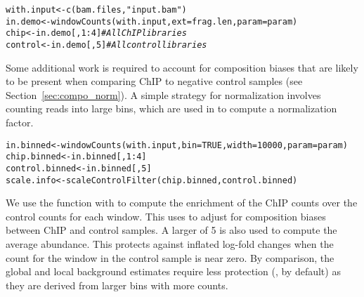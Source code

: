 \documentclass{report}\usepackage[]{graphicx}\usepackage[usenames,dvipsnames]{color}
\newcommand{\hlnum}[1]{\textcolor[rgb]{0.816,0.125,0.439}{#1}}%
\newcommand{\hlstr}[1]{\textcolor[rgb]{0.251,0.627,0.251}{#1}}%
\newcommand{\hlcom}[1]{\textcolor[rgb]{0.502,0.502,0.502}{\textit{#1}}}%
\newcommand{\hlopt}[1]{\textcolor[rgb]{0,0,0}{#1}}%
\newcommand{\hlstd}[1]{\textcolor[rgb]{0.251,0.251,0.251}{#1}}%
\newcommand{\hlkwb}[1]{\textcolor[rgb]{0,0,0}{#1}}%
\newcommand{\hlkwc}[1]{\textcolor[rgb]{0.251,0.251,0.251}{#1}}%
\newcommand{\hlkwd}[1]{\textcolor[rgb]{0.878,0.439,0.125}{#1}}%
\newenvironment{knitrout}{}{} %
\begin{document}
\begin{knitrout}
\color{fgcolor}\begin{kframe}
\begin{alltt}
\hlstd{with.input} \hlkwb{<-} \hlkwd{c}\hlstd{(bam.files,} \hlstr{"input.bam"}\hlstd{)}
\hlstd{in.demo} \hlkwb{<-} \hlkwd{windowCounts}\hlstd{(with.input,} \hlkwc{ext}\hlstd{=frag.len,} \hlkwc{param}\hlstd{=param)}
\hlstd{chip} \hlkwb{<-} \hlstd{in.demo[,}\hlnum{1}\hlopt{:}\hlnum{4}\hlstd{]} \hlcom{# All ChIP libraries}
\hlstd{control} \hlkwb{<-} \hlstd{in.demo[,}\hlnum{5}\hlstd{]} \hlcom{# All control libraries}
\end{alltt}
\end{kframe}
\end{knitrout}

Some additional work is required to account for composition biases that are likely to be present when comparing ChIP to negative control samples (see Section~\ref{sec:compo_norm}).
A simple strategy for normalization involves counting reads into large bins, which are used in  to compute a normalization factor.

\begin{knitrout}
\color{fgcolor}\begin{kframe}
\begin{alltt}
\hlstd{in.binned} \hlkwb{<-} \hlkwd{windowCounts}\hlstd{(with.input,} \hlkwc{bin}\hlstd{=}\hlnum{TRUE}\hlstd{,} \hlkwc{width}\hlstd{=}\hlnum{10000}\hlstd{,} \hlkwc{param}\hlstd{=param)}
\hlstd{chip.binned} \hlkwb{<-} \hlstd{in.binned[,}\hlnum{1}\hlopt{:}\hlnum{4}\hlstd{]}
\hlstd{control.binned} \hlkwb{<-} \hlstd{in.binned[,}\hlnum{5}\hlstd{]}
\hlstd{scale.info} \hlkwb{<-} \hlkwd{scaleControlFilter}\hlstd{(chip.binned, control.binned)}
\end{alltt}
\end{kframe}
\end{knitrout}

We use the  function with  to compute the enrichment of the ChIP counts over the control counts for each window.
This uses  to adjust for composition biases between ChIP and control samples.
A larger  of 5 is also used to compute the average abundance.
This protects against inflated log-fold changes when the count for the window in the control sample is near zero.
By comparison, the global and local background estimates require less protection (, by default) as they are derived from larger bins with more counts.
\end{document}
